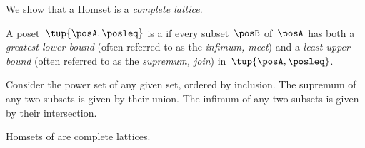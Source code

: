 We show that a \DP Homset is a \emph{complete lattice}.

\begin{definition}\label{def:complete-lattice}
    A poset~$\tup{\posA,\posleq}$ is a \emph{} if every subset~$\posB$ of~$\posA$ has both a \emph{greatest lower bound} (often referred to as the \emph{infimum, meet}) and a \emph{least upper bound} (often referred to as the \emph{supremum, join}) in~$\tup{\posA, \posleq}$.
\end{definition}

\begin{example}
    Consider the power set of any given set, ordered by inclusion. The supremum of any two subsets is given by their union.
    The infimum of any two subsets is given by their intersection.
\end{example}


\begin{lemma}
    \label{lem:DP-homsets-complete-lattice}
    Homsets of \DP are complete lattices.
\end{lemma}

